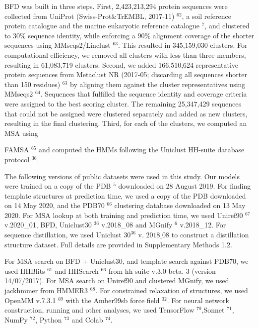 \documentclass[10pt]{article}
\begin{document}
BFD was built in three steps. First, 2,423,213,294 protein sequences were collected from UniProt (Swiss-Prot\&TrEMBL, 2017-11) ${ }^{62}$, a soil reference protein catalogue and the marine eukaryotic reference catalogue ${ }^{7}$, and clustered to $30 \%$ sequence identity, while enforcing a $90 \%$ alignment coverage of the shorter sequences using MMseqs2/Linclust ${ }^{63}$. This resulted in 345,159,030 clusters. For computational efficiency, we removed all clusters with less than three members, resulting in 61,083,719 clusters. Second, we added 166,510,624 representative protein sequences from Metaclust NR (2017-05; discarding all sequences shorter than 150 residues) ${ }^{63}$ by aligning them against the cluster representatives using MMseqs2 ${ }^{64}$. Sequences that fulfilled the sequence identity and coverage criteria were assigned to the best scoring cluster. The remaining 25,347,429 sequences that could not be assigned were clustered separately and added as new clusters, resulting in the final clustering. Third, for each of the clusters, we computed an MSA using

FAMSA ${ }^{65}$ and computed the HMMs following the Uniclust HH-suite database protocol ${ }^{36}$.

The following versions of public datasets were used in this study. Our models were trained on a copy of the PDB ${ }^{5}$ downloaded on 28 August 2019. For finding template structures at prediction time, we used a copy of the PDB downloaded on 14 May 2020, and the PDB70 ${ }^{66}$ clustering database downloaded on 13 May 2020. For MSA lookup at both training and prediction time, we used Uniref90 ${ }^{67}$ v.2020\_01, BFD, Uniclust30 ${ }^{36}$ v.2018\_08 and MGnify ${ }^{6}$ v.2018\_12. For sequence distillation, we used Uniclust $30^{36}$ v. $2018 \_08$ to construct a distillation structure dataset. Full details are provided in Supplementary Methods 1.2.

For MSA search on BFD + Uniclust30, and template search against PDB70, we used HHBlits ${ }^{61}$ and HHSearch ${ }^{66}$ from hh-suite v.3.0-beta. 3 (version 14/07/2017). For MSA search on Uniref90 and clustered MGnify, we used jackhmmer from HMMER3 ${ }^{68}$. For constrained relaxation of structures, we used OpenMM v.7.3.1 ${ }^{69}$ with the Amber99sb force field ${ }^{32}$. For neural network construction, running and other analyses, we used TensorFlow ${ }^{70}$,Sonnet ${ }^{71}$, NumPy ${ }^{72}$, Python ${ }^{73}$ and Colab ${ }^{74}$.
\end{document}
